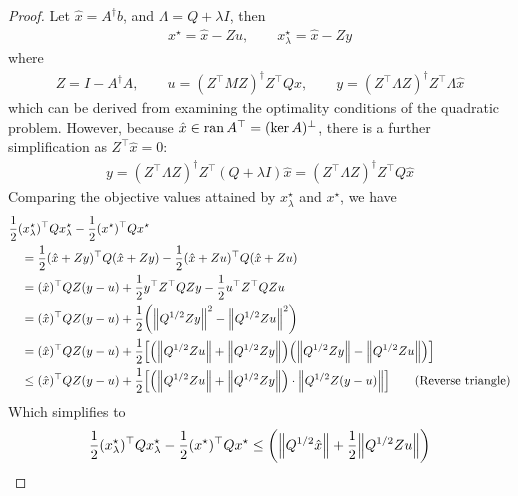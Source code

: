\documentclass[12pt]{article}
\begin{document}
\begin{proof}
  Let \(\hat{x} = A^\dagger b\), and \(\Lambda = Q + \lambda I\), then
  \begin{align*}
    x^\star = \hat{x} - Z u,
      \qquad x_\lambda ^\star = \hat{x} - Z y
  \end{align*}
  where
  \begin{align*}
    Z = I - A^\dagger A,
      \qquad
      u = (Z^\top M Z)^{\dagger} Z^\top Q \hat{x},
      \qquad
      y = (Z^\top \Lambda Z)^{\dagger} Z^\top \Lambda \hat{x}
  \end{align*}
  which can be derived from examining the optimality conditions of the
  quadratic problem.
  However, because \(\hat{x} \in \operatorname{ran} A^\top = (\operatorname{ker} A)^\perp\),
  there is a further simplification as
  \(Z^\top \hat{x} = 0\):
  \begin{align*}
    y = (Z^\top \Lambda Z)^{\dagger} Z^\top (Q + \lambda I) \hat{x}
      = (Z^\top \Lambda Z)^{\dagger} Z^\top Q \hat{x}
  \end{align*}
  Comparing the objective values attained by \(x_\lambda ^\star\)
  and \(x^\star\), we have
  \begin{align*}
    &\frac{1}{2} (x_\lambda ^\star)^\top Q x_\lambda ^\star
      - \frac{1}{2} (x^\star)^\top Q x^\star \\
    &\quad= \frac{1}{2} (\hat{x} + Z y)^\top Q (\hat{x} + Z y)
          - \frac{1}{2} (\hat{x} + Z u)^\top Q (\hat{x} + Z u) \\
    &\quad=
      (\hat{x})^\top Q Z (y - u)
       + \frac{1}{2} y^\top Z^\top Q Z y
       - \frac{1}{2} u^\top Z^\top Q Z u \\
    &\quad=
      (\hat{x})^\top Q Z (y - u)
        + \frac{1}{2}{\left({\left\lVert Q^{1/2} Z y\right\rVert}^2 - {\left\lVert Q^{1/2} Z u\right\rVert}^2\right)} \\
    &\quad=
      (\hat{x})^\top Q Z (y - u)
        + \frac{1}{2}
          {\left[{\left({\left\lVert Q^{1/2} Z u\right\rVert} + {\left\lVert Q^{1/2} Z y\right\rVert}\right)}
                {\left({\left\lVert Q^{1/2} Z y\right\rVert} - {\left\lVert Q^{1/2} Z u\right\rVert}\right)}\right]} \\
    &\quad\leq
      (\hat{x})^\top Q Z (y - u)
        + \frac{1}{2}
          {\left[{\left({\left\lVert Q^{1/2} Z u\right\rVert} + {\left\lVert Q^{1/2} Z y\right\rVert}\right)}
            \cdot {\left\lVert Q^{1/2} Z (y - u)\right\rVert}\right]}
            \tag{Reverse triangle}
  \end{align*}
  Which simplifies to
  \begin{align}
    \frac{1}{2} (x_\lambda ^\star)^\top Q x_\lambda ^\star
      - \frac{1}{2} (x^\star)^\top Q x^\star
    \leq
      {\left({\left\lVert Q^{1/2} \hat{x}\right\rVert}
        + \frac{1}{2} {\left\lVert Q^{1/2} Z u\right\rVert}
\right)}
\end{align}
\end{proof}
\end{document}
